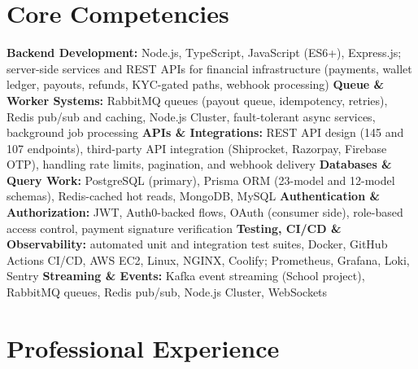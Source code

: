 \documentclass[11pt,a4paper,sans]{moderncv}
\begin{document}
\section{Core Competencies}
\vspace{1pt}
\raggedright
\textbf{Backend Development:} Node.js, TypeScript, JavaScript (ES6+), Express.js; server-side services and REST APIs for financial infrastructure (payments, wallet ledger, payouts, refunds, KYC-gated paths, webhook processing) \textbar{}
\textbf{Queue \& Worker Systems:} RabbitMQ queues (payout queue, idempotency, retries), Redis pub/sub and caching, Node.js Cluster, fault-tolerant async services, background job processing \textbar{}
\textbf{APIs \& Integrations:} REST API design (145 and 107 endpoints), third-party API integration (Shiprocket, Razorpay, Firebase OTP), handling rate limits, pagination, and webhook delivery \textbar{}
\textbf{Databases \& Query Work:} PostgreSQL (primary), Prisma ORM (23-model and 12-model schemas), Redis-cached hot reads, MongoDB, MySQL \textbar{}
\textbf{Authentication \& Authorization:} JWT, Auth0-backed flows, OAuth (consumer side), role-based access control, payment signature verification \textbar{}
\textbf{Testing, CI/CD \& Observability:} automated unit and integration test suites, Docker, GitHub Actions CI/CD, AWS EC2, Linux, NGINX, Coolify; Prometheus, Grafana, Loki, Sentry \textbar{}
\textbf{Streaming \& Events:} Kafka event streaming (School project), RabbitMQ queues, Redis pub/sub, Node.js Cluster, WebSockets
\par\normalfont


\section{Professional Experience}
\vspace{1pt}
\end{document}
